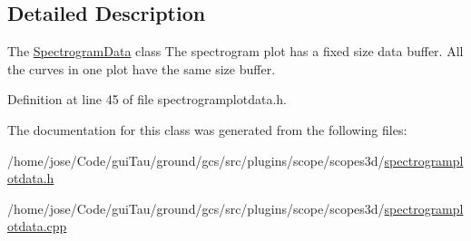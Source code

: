 \subsection{Detailed Description}
The \hyperlink{class_spectrogram_data}{Spectrogram\-Data} class The spectrogram plot has a fixed size data buffer. All the curves in one plot have the same size buffer. 

Definition at line 45 of file spectrogramplotdata.\-h.



The documentation for this class was generated from the following files\-:\begin{DoxyCompactItemize}
\item 
/home/jose/\-Code/gui\-Tau/ground/gcs/src/plugins/scope/scopes3d/\hyperlink{spectrogramplotdata_8h}{spectrogramplotdata.\-h}\item 
/home/jose/\-Code/gui\-Tau/ground/gcs/src/plugins/scope/scopes3d/\hyperlink{spectrogramplotdata_8cpp}{spectrogramplotdata.\-cpp}\end{DoxyCompactItemize}
